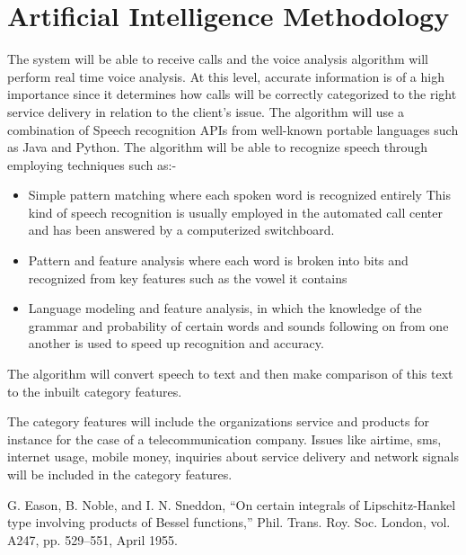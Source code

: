 \documentclass[conference]{IEEEtran}
\begin{document}
\section{Artificial Intelligence Methodology}
The system will be able to receive calls and the voice analysis algorithm will perform real time voice analysis. At this level, accurate information is of a high importance since it determines how calls will be correctly categorized to the right service delivery in relation to the client’s issue. The algorithm will use a combination of Speech recognition APIs from well-known portable languages such as Java and Python. The algorithm will be able to recognize speech through employing techniques such as:-
\begin{itemize}
\item Simple pattern matching where each spoken word is recognized entirely
This kind of speech recognition is usually employed in the automated call center and has been answered by a computerized switchboard.
\item 	Pattern and feature analysis where each word is broken into bits and recognized from key features such as the vowel it contains
\item Language modeling and feature analysis, in which the knowledge of the grammar and probability of certain words and sounds following on from one another is used to speed up recognition and accuracy.
\end{itemize}
The algorithm will convert speech to text and then make comparison of this text to the inbuilt category features.

The category features will include the organizations service and products for instance for the case of a telecommunication company. Issues like airtime, sms, internet usage, mobile money, inquiries about service delivery and network signals will be included in the category features.

\begin{thebibliography}{00}
 G. Eason, B. Noble, and I. N. Sneddon, ``On certain integrals of Lipschitz-Hankel type involving products of Bessel functions,'' Phil. Trans. Roy. Soc. London, vol. A247, pp. 529--551, April 1955.
\end{thebibliography}
\vspace{12pt}
\end{document}
